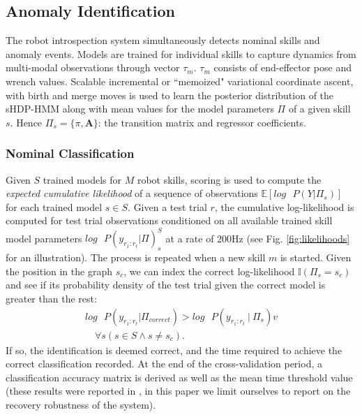 \documentclass[letterpaper, 10 pt, conference]{ieeeconf}  %
\newcommand\given[1][]{\:#1\vert\:}
\begin{document}
\subsection{Anomaly Identification} \label{subsec:identification}
The robot introspection system simultaneously detects nominal skills and anomaly events. Models are trained for individual skills to capture dynamics from multi-modal observations through vector $\tau_m$. $\tau_m$ consists of end-effector pose and wrench values. Scalable incremental or ``memoized" variational coordinate ascent, with birth and merge moves \cite{2014AOAS-Fox-JointModel_MutlipleTimeSeries_BetaProcess_MotionCapture} is used to learn the posterior distribution of the sHDP-HMM along with mean values for the model parameters $\Pi$ of a given skill $s$. Hence $\Pi_s=\{\pi,\textbf{A}\}$: the transition matrix and regressor coefficients.
\subsubsection{Nominal Classification} \label{subsubsec:nominal}
Given $S$ trained models for $M$ robot skills, scoring is used to compute the \textit{expected cumulative likelihood} of a sequence of observations $\mathbb{E} \left[ log \mbox{ } P(Y | \Pi_s) \right]$ for each trained model $s \in S$. 
Given a test trial $r$, the cumulative log-likelihood is computed for test trial observations conditioned on all available trained skill model parameters $log \mbox{ } P(y_{r_1:r_t} | \Pi)_s^S$ at a rate of 200Hz (see Fig. \ref{fig:likelihoods} for an illustration). The process is repeated when a new skill $m$ is started. Given the position in the graph $s_c$, we can index the correct log-likelihood $\mathbb{I}(\Pi_s=s_c)$ and see if its probability density of the test trial given the correct model is greater than the rest: 
\begin{eqnarray}
	log \mbox{ } P(y_{r_1:r_t} | \Pi_{correct}) > log \mbox{ } P(y_{r_1:r_t} \given \Pi_s)v\nonumber \\
	\quad \forall s(s \in S \land s \neq s_c). \nonumber
    \label{eqtn:state_classification_condition}
\end{eqnarray}
If so, the identification is deemed correct, and the time required to achieve the correct classification recorded. At the end of the cross-validation period, a classification accuracy matrix is derived as well as the mean time threshold value (these results were reported in \cite{2017humanoids-rojas-shdp-var-hmm}, in this paper we limit ourselves to report on the recovery robustness of the system). 
\end{document}
